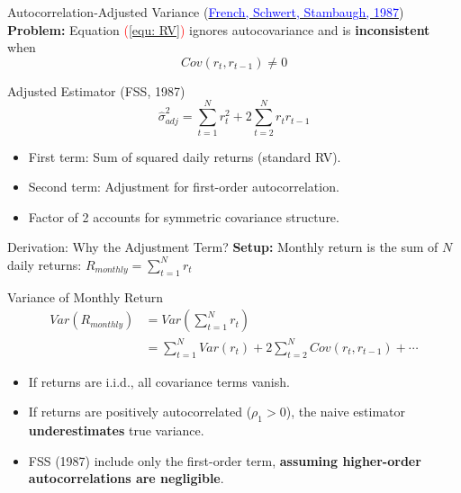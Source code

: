 \documentclass{beamer}
\begin{document}
\begin{frame}{Autocorrelation-Adjusted Variance (\href{https://doi.org/10.1016/0304-405X(87)90026-2}{\textcolor{blue}{French, Schwert, Stambaugh, 1987}})}
    \textbf{Problem:} Equation \textcolor{red}{(\ref{equ: RV})} ignores autocovariance and is \textbf{inconsistent} when \\
    \begin{equation*}
        Cov(r_t, r_{t-1}) \neq 0
    \end{equation*}

    \begin{block}{Adjusted Estimator (FSS, 1987)}
        \begin{equation}
            \hat{\sigma}^2_{adj} = \sum_{t=1}^{N} r_t^2 + 2\sum_{t=2}^{N} r_t r_{t-1}
        \end{equation}
    \end{block}
    
    \begin{itemize}
        \item First term: Sum of squared daily returns (standard RV).
        \item Second term: Adjustment for first-order autocorrelation.
        \item Factor of 2 accounts for symmetric covariance structure.
    \end{itemize}
\end{frame}

\begin{frame}{Derivation: Why the Adjustment Term?}
    \textbf{Setup:} Monthly return is the sum of $N$ daily returns: $R_{monthly} = \sum_{t=1}^{N} r_t$
    
    \begin{block}{Variance of Monthly Return}
        \begin{align}
            Var(R_{monthly}) &= Var\left(\sum_{t=1}^{N} r_t\right) \nonumber \\
            &= \sum_{t=1}^{N} Var(r_t) + 2\sum_{t=2}^{N} Cov(r_t, r_{t-1}) + \cdots
        \end{align}
    \end{block}
    \begin{itemize}
        \item If returns are i.i.d., all covariance terms vanish.
        \item If returns are positively autocorrelated ($\rho_1 > 0$), the naive estimator \textbf{underestimates} true variance.
        \item FSS (1987) include only the first-order term, \textbf{assuming higher-order autocorrelations are negligible}.
    \end{itemize}
\end{frame}
\end{document}
